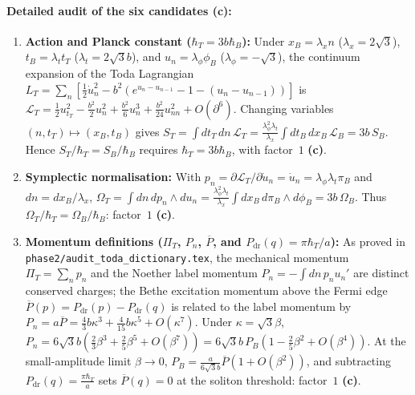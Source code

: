 \documentclass[11pt,a4paper]{article}
\newcommand{\claim}[1]{\textbf{(#1)}}
\begin{document}
\paragraph{Detailed audit of the six candidates \claim{c}:}
\begin{enumerate}
  \item \textbf{Action and Planck constant ($\hbar_T = 3b\hbar_B$):}
  Under $x_B = \lambda_x n$ ($\lambda_x = 2\sqrt{3}$), $t_B = \lambda_t t_T$ ($\lambda_t = 2\sqrt{3}b$),
  and $u_n = \lambda_\phi\phi_B$ ($\lambda_\phi = -\sqrt{3}$), the continuum expansion of the Toda
  Lagrangian $L_T = \sum_n[\frac{1}{2}\dot u_n^2 - b^2(e^{u_n-u_{n-1}}-1-(u_n-u_{n-1}))]$ is
  $\mathcal{L}_T = \frac{1}{2}u_{t_T}^2 - \frac{b^2}{2}u_n^2 + \frac{b^2}{6}u_n^3 + \frac{b^2}{24}u_{nn}^2 + O(\partial^6)$.
  Changing variables $(n,t_T)\mapsto (x_B,t_B)$ gives $S_T = \int dt_T\,dn\,\mathcal{L}_T = \frac{\lambda_\phi^2\lambda_t}{\lambda_x}\int dt_B\,dx_B\,\mathcal{L}_B = 3b\,S_B$.
  Hence $S_T/\hbar_T = S_B/\hbar_B$ requires $\hbar_T = 3b\hbar_B$, with factor~$1$ \claim{c}.

  \item \textbf{Symplectic normalisation:}
  With $p_n = \partial\mathcal{L}_T/\partial\dot u_n = \dot u_n = \lambda_\phi\lambda_t\pi_B$ and $dn = dx_B/\lambda_x$,
  $\Omega_T = \int dn\,dp_n\wedge du_n = \frac{\lambda_\phi^2\lambda_t}{\lambda_x}\int dx_B\,d\pi_B\wedge d\phi_B = 3b\,\Omega_B$.
  Thus $\Omega_T/\hbar_T = \Omega_B/\hbar_B$: factor~$1$ \claim{c}.

  \item \textbf{Momentum definitions ($\Pi_T$, $P_n$, $\overline{P}$, and $P_{\mathrm{dr}}(q)=\pi\hbar_T/a$):}
  As proved in \texttt{phase2/audit\_toda\_dictionary.tex}, the mechanical momentum $\Pi_T = \sum_n p_n$
  and the Noether label momentum $P_n = -\int dn\,p_n u_n'$ are distinct conserved charges; the Bethe
  excitation momentum above the Fermi edge $\overline{P}(p) = P_{\mathrm{dr}}(p) - P_{\mathrm{dr}}(q)$
  is related to the label momentum by $P_n = a\overline{P} = \frac{4}{3}b\kappa^3 + \frac{4}{15}b\kappa^5 + O(\kappa^7)$.
  Under $\kappa = \sqrt{3}\beta$, $P_n = 6\sqrt{3}b(\frac{2}{3}\beta^3 + \frac{2}{5}\beta^5 + O(\beta^7)) = 6\sqrt{3}b\,P_B(1 - \frac{2}{5}\beta^2 + O(\beta^4))$.
  At the small-amplitude limit $\beta\to 0$, $P_B = \frac{a}{6\sqrt{3}b}\overline{P}(1+O(\beta^2))$, and
  subtracting $P_{\mathrm{dr}}(q) = \frac{\pi\hbar_T}{a}$ sets $\overline{P}(q)=0$ at the soliton threshold: factor~$1$ \claim{c}.


\end{enumerate}
\end{document}

